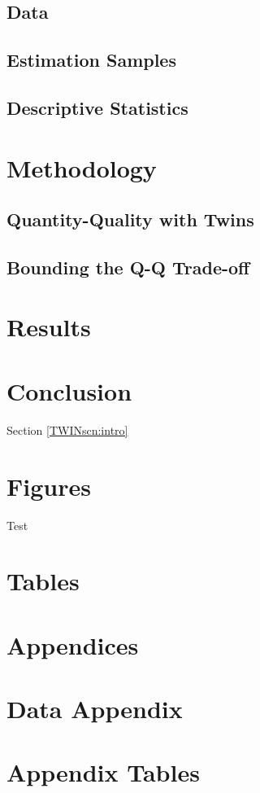 \documentclass{article}[11pt,subeqn]
\begin{document}
\begin{spacing}{1.4}
\subsection{Data}                                  \label{TWINsscn:data}
\subsection{Estimation Samples}                    \label{TWINsscn:samples}
\subsection{Descriptive Statistics}                \label{TWINsscn:descriptives}
\section{Methodology}                              \label{TWINscn:method}
\subsection{Quantity-Quality with Twins}           \label{TWINsscn:methodQQ}
\subsection{Bounding the Q-Q Trade-off}            \label{TWINsscn:methodBounds}
\section{Results}                                  \label{TWINscn:results}
\section{Conclusion}                               \label{TWINscn:conclusion}

Section \ref{TWINscn:intro}
\newpage
\section*{Figures}
Test


\clearpage
\section*{Tables}
\clearpage




\newpage
\appendix
\section*{Appendices}
\section{Data Appendix}
\section{Appendix Tables}



\end{spacing}
\end{document}
